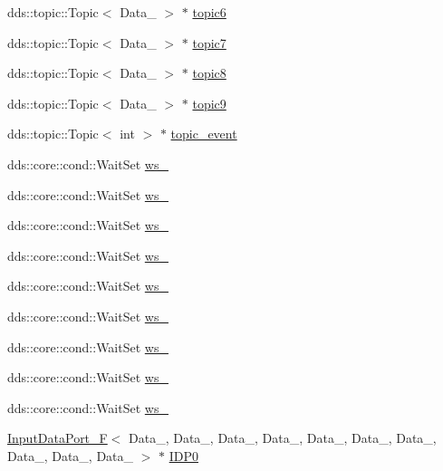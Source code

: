 \begin{DoxyCompactItemize}
dds\+::topic\+::\+Topic$<$ Data\+\_ $>$ $\ast$ \hyperlink{classFusion__operator_a747b20c14e1a835bb763694a1368d857}{topic6}
\item 
dds\+::topic\+::\+Topic$<$ Data\+\_ $>$ $\ast$ \hyperlink{classFusion__operator_abeb8122aebb4d834cb3433aaa99365dd}{topic7}
\item 
dds\+::topic\+::\+Topic$<$ Data\+\_ $>$ $\ast$ \hyperlink{classFusion__operator_ab050a3199eb223c53a60087961d0e0cc}{topic8}
\item 
dds\+::topic\+::\+Topic$<$ Data\+\_ $>$ $\ast$ \hyperlink{classFusion__operator_afb0a94863c813bbc7fc2a52838301937}{topic9}
\item 
dds\+::topic\+::\+Topic$<$ int $>$ $\ast$ \hyperlink{classFusion__operator_ab2ba1dc33bae5f39ecabd4018bedf47f}{topic\+\_\+event}
\item 
dds\+::core\+::cond\+::\+Wait\+Set \hyperlink{classFusion__operator_a15a7b6ccddbe0b8ad3bd8932a38c6db2}{ws\+\_}
\item 
dds\+::core\+::cond\+::\+Wait\+Set \hyperlink{classFusion__operator_a6ca4a3185f87b382542eaf241eab3e52}{ws\+\_}
\item 
dds\+::core\+::cond\+::\+Wait\+Set \hyperlink{classFusion__operator_af231872d2c22b353710ee90b6a2be4bf}{ws\+\_}
\item 
dds\+::core\+::cond\+::\+Wait\+Set \hyperlink{classFusion__operator_a31133e7918c57cbca7cc42f141ff672d}{ws\+\_}
\item 
dds\+::core\+::cond\+::\+Wait\+Set \hyperlink{classFusion__operator_a5dea84d5320494140d650bc0823d56f2}{ws\+\_}
\item 
dds\+::core\+::cond\+::\+Wait\+Set \hyperlink{classFusion__operator_ac2bc73cfd2d097373d0716e61c843a33}{ws\+\_}
\item 
dds\+::core\+::cond\+::\+Wait\+Set \hyperlink{classFusion__operator_a32e2694d512a9ba74b13a0b07f8f4649}{ws\+\_}
\item 
dds\+::core\+::cond\+::\+Wait\+Set \hyperlink{classFusion__operator_a0c468d5a6c0fb3b6adf93372ca678c65}{ws\+\_}
\item 
dds\+::core\+::cond\+::\+Wait\+Set \hyperlink{classFusion__operator_a07930a190539ebefac664cc34d81dbe8}{ws\+\_}
\item 
\hyperlink{classInputDataPort__F}{Input\+Data\+Port\+\_\+F}$<$ Data\+\_, Data\+\_, Data\+\_, Data\+\_, Data\+\_, Data\+\_, Data\+\_, Data\+\_, Data\+\_, Data\+\_ $>$ $\ast$ \hyperlink{classFusion__operator_a7bcb3db4950e0de858fcd1e481e987d9}{I\+D\+P0}
\item 

\end{DoxyCompactItemize}
